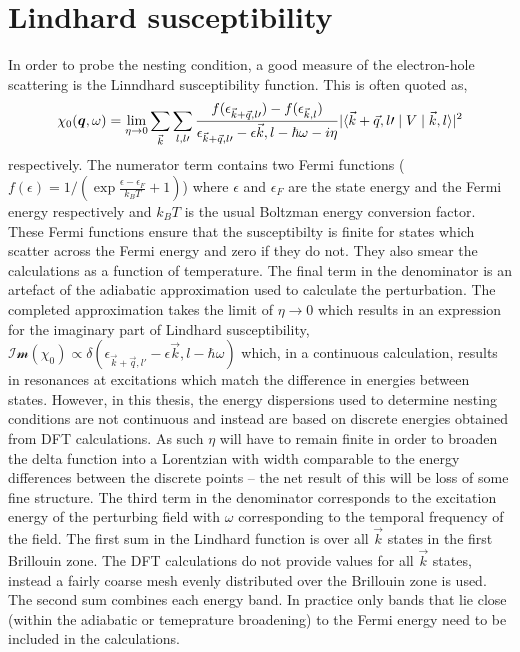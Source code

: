 
\section{Lindhard susceptibility}
\label{Sec:Theo:Susceptibility}

In order to probe the nesting condition, a good measure of the electron-hole scattering is the Linndhard susceptibility function. This is often quoted as,
\begin{equation}
\chi_0(\boldsymbol{q}, \omega) = \lim_{\eta \to 0} \sum_{\vec{k}}\sum_{l,l\prime}\frac{f(\epsilon_{\vec{k}+\vec{q},l\prime}) - f(\epsilon_{\vec{k},l})}{\epsilon_{\vec{k}+\vec{q},l\prime} - \epsilon{\vec{k},l} - \hbar\omega - i\eta}|\langle \vec{k}+\vec{q},l\prime \mid  V \mid \vec{k},l \rangle|^2
\label{Eqn:Intro:Lindhard}
\end{equation}
respectively. The numerator term contains two Fermi functions ($f(\epsilon) = 1/(\exp{\frac{\epsilon - \epsilon_F}{k_B T}} + 1)$) where $\epsilon$ and $\epsilon_F$ are the state energy and the Fermi energy respectively and $k_BT$ is the usual Boltzman energy conversion factor. These Fermi functions ensure that the susceptibilty is finite for states which scatter across the Fermi energy and zero if they do not. They also smear the calculations as a function of temperature. The final term in the denominator is an artefact of the adiabatic approximation used to calculate the perturbation. The completed approximation takes the limit of $\eta \to 0$ which results in an expression for the imaginary part of Lindhard susceptibility, $\mathcal{Im}(\chi_0) \propto \delta(\epsilon_{\vec{k}+\vec{q},l\prime} - \epsilon{\vec{k},l} - \hbar\omega)$ which, in a continuous calculation, results in resonances at excitations which match the difference in energies between states. However, in this thesis, the energy dispersions used to determine nesting conditions are not continuous and instead are based on discrete energies obtained from DFT calculations. As such $\eta$ will have to remain finite in order to broaden the delta function into a Lorentzian with width comparable to the energy differences between the discrete points -- the net result of this will be loss of some fine structure. The third term in the denominator corresponds to the excitation energy of the perturbing field with $\omega$ corresponding to the temporal frequency of the field. The first sum in the Lindhard function is over all $\vec{k}$ states in the first Brillouin zone. The DFT calculations do not provide values for all $\vec{k}$ states, instead a fairly coarse mesh evenly distributed over the Brillouin zone is used. The second sum combines each energy band. In practice only bands that lie close (within the adiabatic or temeprature broadening) to the Fermi energy need to be included in the calculations.

